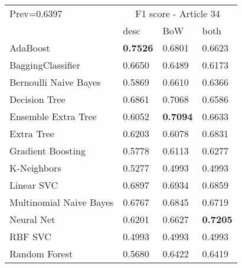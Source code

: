 \begin{tabular}{|l|l|l|l| }
\hline
Prev=0.6397 &  \multicolumn{3}{c|}{F1 score - Article 34} \\
\cline{2-4} & desc & BoW & both \\ \hline
AdaBoost                & {\bf 0.7526} & 0.6801 & 0.6623\\
BaggingClassifier       & 0.6650 & 0.6489 & 0.6173\\
Bernoulli Naive Bayes   & 0.5869 & 0.6610 & 0.6366\\
Decision Tree           & 0.6861 & 0.7068 & 0.6586\\
Ensemble Extra Tree     & 0.6052 & {\bf 0.7094} & 0.6633\\
Extra Tree              & 0.6203 & 0.6078 & 0.6831\\
Gradient Boosting       & 0.5778 & 0.6113 & 0.6277\\
K-Neighbors             & 0.5277 & 0.4993 & 0.4993\\
Linear SVC              & 0.6897 & 0.6934 & 0.6859\\
Multinomial Naive Bayes & 0.6767 & 0.6845 & 0.6719\\
Neural Net              & 0.6201 & 0.6627 & {\bf 0.7205}\\
RBF SVC                 & 0.4993 & 0.4993 & 0.4993\\
Random Forest           & 0.5680 & 0.6422 & 0.6419\\
\hline
\end{tabular}